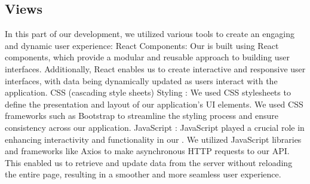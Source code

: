 \subsection{Views}\label{views}
\hspace*{1cm} In this part of our development, we utilized various  tools to create an engaging and dynamic user experience: React \cite{react} Components: Our  is built using React \cite{react} components, which provide a modular and reusable approach to building user interfaces. Additionally, React \cite{react} enables us to create interactive and responsive user interfaces, with data being dynamically updated as users interact with the application. CSS (cascading style sheets) Styling \cite{htmlcssjs}: We used CSS stylesheets to define the presentation and layout of our application's UI elements. We used CSS \cite{htmlcssjs} frameworks such as Bootstrap \cite{boostrap} to streamline the styling process and ensure consistency across our application. JavaScript \cite{htmlcssjs}: JavaScript played a crucial role in enhancing interactivity and functionality in our . We utilized JavaScript libraries and frameworks like Axios to make asynchronous HTTP requests to our  API. This enabled us to retrieve and update data from the server without reloading the entire page, resulting in a smoother and more seamless user experience.

\par
\hrulefill 

